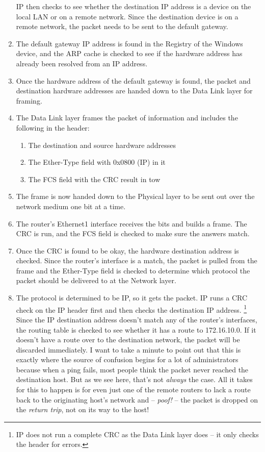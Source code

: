 \begin{enumerate}
  IP then checks to see whether the destination IP address is a device
  on the local LAN or on a remote network. Since the destination device
  is on a remote network, the packet needs to be sent to the default
  gateway.
\item
  \protect\hypertarget{c09.xhtmlux5cux23Page_365}{}{}The default gateway
  IP address is found in the Registry of the Windows device, and the ARP
  cache is checked to see if the hardware address has already been
  resolved from an IP address.
\item
  Once the hardware address of the default gateway is found, the packet
  and destination hardware addresses are handed down to the Data Link
  layer for framing.
\item
  The Data Link layer frames the packet of information and includes the
  following in the header:

  \begin{enumerate}
    \item
    The destination and source hardware addresses
  \item
    The Ether-Type field with 0x0800 (IP) in it
  \item
    The FCS field with the CRC result in tow
  \end{enumerate}
\item
  The frame is now handed down to the Physical layer to be sent out over
  the network medium one bit at a time.
\item
  The router's Ethernet1 interface receives the bits and builds a
  frame. The CRC is run, and the FCS field is checked to make sure the
  answers match.
\item
  Once the CRC is found to be okay, the hardware destination address is
  checked. Since the router's interface is a match, the packet is pulled
  from the frame and the Ether-Type field is checked to determine which
  protocol the packet should be delivered to at the Network layer.
\item
   The protocol is determined to be IP, so it gets the packet.
   IP runs a CRC check on the IP header first and then checks the destination IP address.%
      \footnote{IP does not run a complete CRC as the Data Link layer does -- it only checks the header for errors.}
   Since the IP destination address doesn't match any of the router's
   interfaces, the routing table is checked to see whether it has a route
   to 172.16.10.0. If it doesn't have a route over to the destination
   network, the packet will be discarded immediately. I want to take a
   minute to point out that this is exactly where the source of confusion
   begins for a lot of administrators because when a ping fails, most
   people think the packet never reached the destination host. But as we
   see here, that's not \emph{always} the case. All it takes for this to
   happen is for even just one of the remote routers to lack a route back
   to the originating host's network and --  \emph{poof!} -- the packet is
   dropped on the \emph{return trip}, not on its way to the host!


\end{enumerate}
